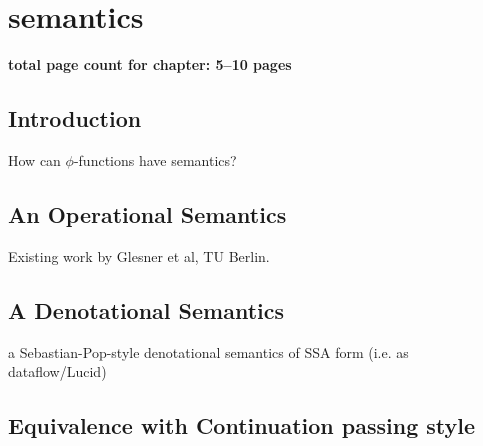 \chapter*{semantics}


\textbf{total page count for chapter: 5--10 pages}


\section{Introduction}

How can $\phi$-functions have semantics?


\section{An Operational Semantics}

Existing work by Glesner et al, TU Berlin.


\section{A Denotational Semantics}

a Sebastian-Pop-style denotational semantics of SSA form (i.e. as
dataflow/Lucid)




\section{Equivalence with Continuation passing style}


